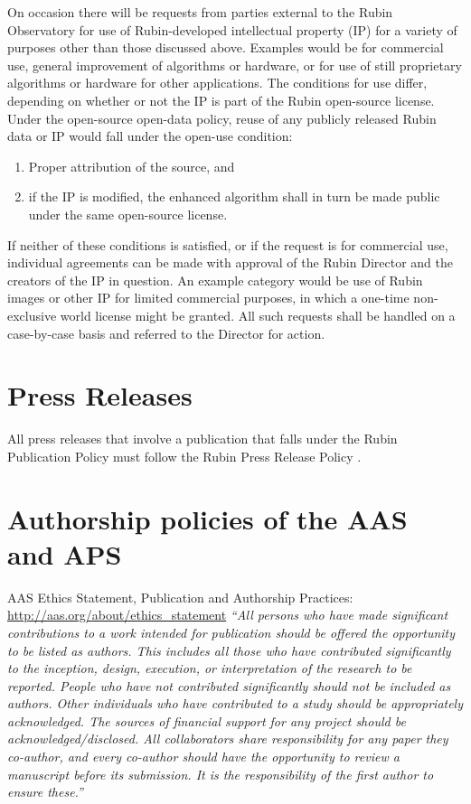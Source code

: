 On occasion there will be requests from parties external to the Rubin Observatory for use of Rubin-developed intellectual property (IP) for a variety of purposes other than those discussed above.
Examples would be for commercial use, general improvement of algorithms or hardware, or for use of still proprietary algorithms or hardware for other applications.
The conditions for use differ, depending on whether or not the IP is part of the Rubin open-source license.
Under the open-source open-data policy, reuse of any publicly released Rubin data or IP would fall under the open-use condition:

\begin{enumerate}
\def\labelenumi{\arabic{enumi}.}
\item
  Proper attribution of the source, and
\item
  if the IP is modified, the enhanced algorithm shall in turn be made public under the same open-source license.
\end{enumerate}

If neither of these conditions is satisfied, or if the request is for commercial use, individual agreements can be made with approval of the Rubin Director and the creators of the IP in question.
An example category would be use of Rubin images or other IP for limited commercial purposes, in which a one-time non-exclusive world license might be granted.
All such requests shall be handled on a case-by-case basis and referred to the Director for action.

\section{Press Releases}\label{press-releases}

All press releases that involve a publication that falls under the Rubin Publication Policy must follow the Rubin Press Release Policy .

\appendix

\section{Authorship policies of the AAS and
APS}\label{appendix-authorship-policies-of-the-aas-and-aps}

AAS Ethics Statement, Publication and Authorship Practices:
\url{http://aas.org/about/ethics_statement}
\emph{``All persons who have made significant contributions to a work intended for publication should be offered the opportunity to be listed as authors.
This includes all those who have contributed significantly to the inception, design, execution, or interpretation of the research to be reported.
People who have not contributed significantly should not be included as authors.
Other individuals who have contributed to a study should be appropriately acknowledged.
The sources of financial support for any project should be acknowledged/disclosed.
All collaborators share responsibility for any paper they co-author, and every co-author should have the opportunity to review a manuscript before its submission.
It is the responsibility of the first author to ensure these.''}

